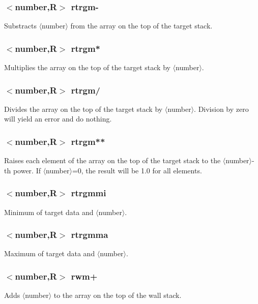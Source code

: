 \documentclass[a4paper,10pt]{report}
\begin{document}
\subsubsection{$<$number,{\bf R}$>$ rtrgm-}\label{sec:rtrgm-}
Substracts $\langle$number$\rangle$ from the array on the top of the target stack.

\subsubsection{$<$number,{\bf R}$>$ rtrgm*}\label{sec:rtrgm*}
Multiplies the array on the top of the target stack by $\langle$number$\rangle$.

\subsubsection{$<$number,{\bf R}$>$ rtrgm/}\label{sec:rtrgm/}
Divides the array on the top of the target stack by $\langle$number$\rangle$. Division by
zero will yield an error and do nothing.

\subsubsection{$<$number,{\bf R}$>$ rtrgm**}\label{sec:rtrgm**}
Raises each element of the array on the top of the target stack to the $\langle$number$\rangle$-th power. If $\langle$number$\rangle$=0, the result will be 1.0 for all elements.

\subsubsection{$<$number,{\bf R}$>$ rtrgmmi}\label{sec:rtrgmmi}
Minimum of target data and $\langle$number$\rangle$.

\subsubsection{$<$number,{\bf R}$>$ rtrgmma}\label{sec:rtrgmma}
Maximum of target data and $\langle$number$\rangle$.

\subsubsection{$<$number,{\bf R}$>$ rwm+}\label{sec:rwm+}
Adds $\langle$number$\rangle$ to the array on the top of the wall stack.
\end{document}
